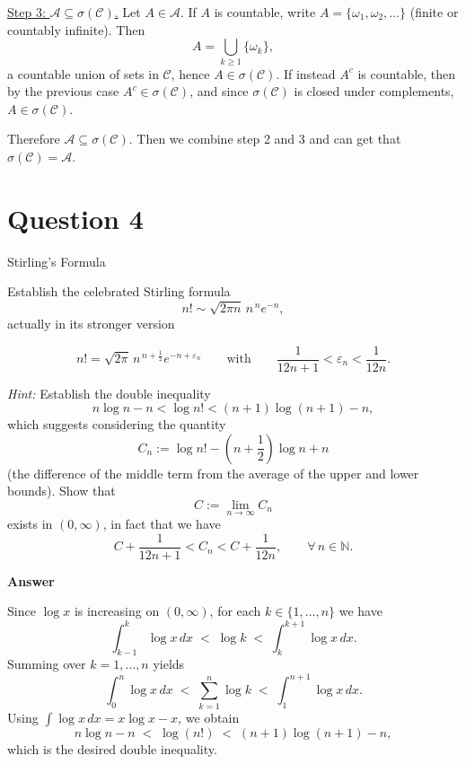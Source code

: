 \documentclass[letterpaper]{article}
\begin{document}
			\medskip
			\noindent\underline{Step 3: $\mathcal{A}\subseteq\sigma(\mathcal{C})$.}
			Let $A\in\mathcal{A}$.
			If $A$ is countable, write $A=\{\omega_1,\omega_2,\dots\}$ (finite or countably infinite).
			Then
			\[
			A=\bigcup_{k\ge 1}\{\omega_k\},
			\]
			a countable union of sets in $\mathcal{C}$, hence $A\in\sigma(\mathcal{C})$.
			If instead $A^c$ is countable, then by the previous case $A^c\in\sigma(\mathcal{C})$,
			and since $\sigma(\mathcal{C})$ is closed under complements, $A\in\sigma(\mathcal{C})$.
			
			Therefore $\mathcal{A}\subseteq\sigma(\mathcal{C})$. Then we combine step 2 and 3 and can get that  $\sigma(\mathcal{C})=\mathcal{A}$.

		
		
		\clearpage
		
		\section{Question 4}
		{\color{deepred} Stirling's Formula}
		
			Establish the celebrated Stirling formula
			\[
			n! \sim \sqrt{2\pi n}\, n^{\,n} e^{-n},
			\]
			actually in its stronger version
			
			$$
				n! = \sqrt{2\pi}\, n^{\,n+\frac12} e^{-n+\varepsilon_n}
				\qquad \text{with} \qquad
				\frac{1}{12n+1} < \varepsilon_n < \frac{1}{12n}.
			$$
			
			\emph{Hint:} Establish the double inequality
			\[
			n \log n - n < \log n! < (n+1)\log(n+1) - n,
			\]
			which suggests considering the quantity
			\[
			C_n := \log n! - \left(n+\frac12\right)\log n + n
			\]
			(the difference of the middle term from the average of the upper and lower bounds).
			Show that
			\[
			C := \lim_{n\to\infty} C_n
			\]
			exists in $(0,\infty)$, in fact that we have
			\[
			C + \frac{1}{12n+1} < C_n < C + \frac{1}{12n},
			\qquad \forall\, n \in \mathbb{N}.
			\]

		
		\textbf{Answer}
		
			Since $\log x$ is increasing on $(0,\infty)$, for each $k\in\{1,\dots,n\}$ we have
			\[
			\int_{k-1}^{k}\log x\,dx \;<\; \log k \;<\; \int_{k}^{k+1}\log x\,dx .
			\]
			Summing over $k=1,\dots,n$ yields
			\[
			\int_{0}^{n}\log x\,dx \;<\; \sum_{k=1}^n \log k \;<\; \int_{1}^{n+1}\log x\,dx .
			\]
			Using $\int \log x\,dx = x\log x-x$, we obtain
			\[
			n\log n - n \;<\; \log(n!) \;<\; (n+1)\log(n+1)-n,
			\]
			which is the desired double inequality.
			
\end{document}
